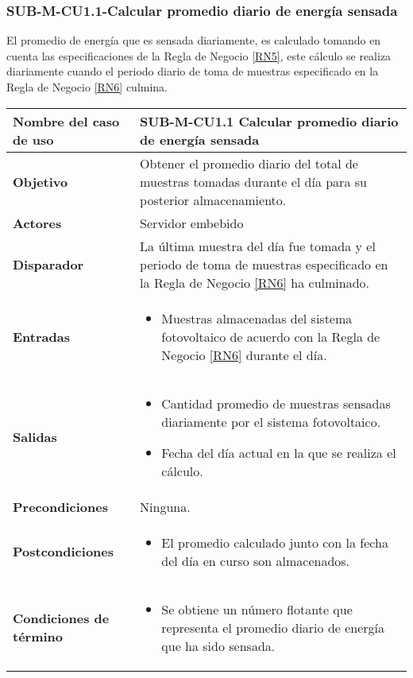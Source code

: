 \subsubsection{SUB-M-CU1.1-Calcular promedio diario de energía sensada}\label{SUB-M-CU1.1}
El promedio de energía que es sensada diariamente, es calculado tomando en cuenta las especificaciones de la Regla de Negocio \ref{RN5}, este cálculo se realiza diariamente cuando el periodo diario de toma de muestras especificado en la Regla de Negocio \ref{RN6} culmina.

\begin{longtable}{|J{5cm}|J{10.3cm}|}
	\hline
	\textbf{Nombre del caso de uso} &
		SUB-M-CU1.1 Calcular promedio diario de energía sensada \\ \hline
	\textbf{Objetivo} &
		Obtener el promedio diario del total de muestras tomadas durante el día para su posterior almacenamiento. \\ \hline
	\textbf{Actores} &
		Servidor embebido \\ \hline 
	\textbf{Disparador} & 
		La última muestra del día fue tomada y el periodo de toma de muestras especificado en la Regla de Negocio \ref{RN6} ha culminado. \\ \hline 
	\textbf{Entradas} & 
		\begin{itemize}
				\item Muestras almacenadas del sistema fotovoltaico de acuerdo con la Regla de Negocio \ref{RN6} durante el día.
		\end{itemize}\\ \hline 
	\textbf{Salidas} & 
		\begin{itemize}
			\item Cantidad promedio de muestras sensadas diariamente por el sistema fotovoltaico.
			\item Fecha del día actual en la que se realiza el cálculo.
		\end{itemize} \\ \hline
	\textbf{Precondiciones} &
		Ninguna.\\ \hline
	\textbf{Postcondiciones} &
		\begin{itemize}
			\item El promedio calculado junto con la fecha del día en curso son almacenados.
		\end{itemize}\\ \hline
	\textbf{Condiciones de término} & 
		\begin{itemize}
			\item Se obtiene un número flotante que representa el promedio diario de energía que ha sido sensada.

\end{itemize}
\end{longtable}

